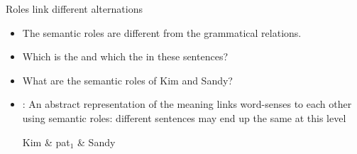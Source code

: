 \begin{frame}{Roles link different alternations}
\begin{exe}
  \ex{}
  \ex{}
\end{exe}
\begin{itemize}
\item The semantic roles are different from the grammatical relations.
\item Which is the  and which the  in these sentences?
\item What are the semantic roles of Kim and Sandy?
\item {}: An abstract representation of the meaning links word-senses to
  each other using semantic roles: different sentences may end up the same at this level
\\[2ex] \begin{dependency}
\begin{deptext}[column sep=1em]
Kim \& pat$_1$ \& Sandy \\ %
\end{deptext}
\end{dependency}

\end{itemize}

\end{frame}

